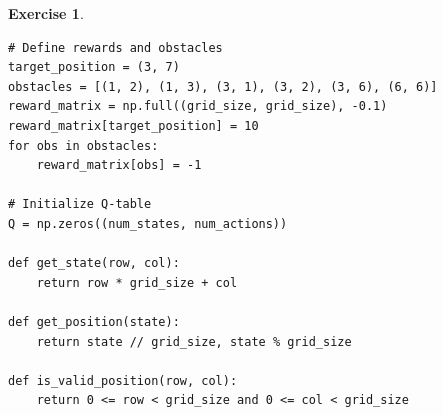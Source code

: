 \documentclass[letter,11pt]{article}
\newtheorem{exercise}{Exercise}[section]
\begin{document}
\begin{exercise}
\begin{lstlisting}
# Define rewards and obstacles
target_position = (3, 7)
obstacles = [(1, 2), (1, 3), (3, 1), (3, 2), (3, 6), (6, 6)]
reward_matrix = np.full((grid_size, grid_size), -0.1)
reward_matrix[target_position] = 10
for obs in obstacles:
    reward_matrix[obs] = -1

# Initialize Q-table
Q = np.zeros((num_states, num_actions))

def get_state(row, col):
    return row * grid_size + col

def get_position(state):
    return state // grid_size, state % grid_size

def is_valid_position(row, col):
    return 0 <= row < grid_size and 0 <= col < grid_size

\end{lstlisting}



\end{exercise}
\end{document}
